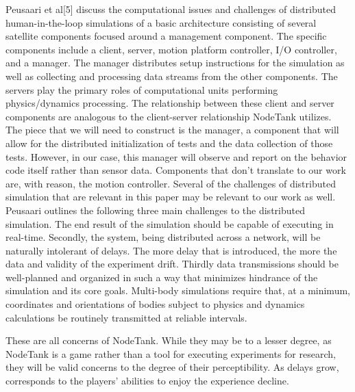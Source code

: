 \documentclass[conference]{IEEEtran}
\begin{document}
Peusaari et al[5] discuss the computational issues and challenges of distributed human-in-the-loop simulations of a basic architecture consisting of several satellite components 
focused around a management component. The specific components include a client, server, motion platform controller, I/O controller, and a manager. The manager distributes setup 
instructions for the simulation as well as collecting and processing data  streams from the other components. The servers play the primary roles of computational units performing 
physics/dynamics processing. The relationship between these client and server components are analogous to the client-server relationship NodeTank utilizes. The piece that we will 
need to construct is the manager, a component that will allow for the distributed initialization of tests and the data collection of those tests. However, in our case, this manager
will observe and report on the behavior code itself rather than sensor data. Components that don’t translate to our work are, with reason, the motion controller. Several of the 
challenges of distributed simulation that are relevant in this paper may be relevant to our work as well. Peusaari outlines the following three main challenges to the distributed 
simulation. The end result of the simulation should be capable of executing in real-time. Secondly, the system, being distributed across a network, will be naturally intolerant of 
delays. The more delay that is introduced, the more the data and validity of the experiment drift. Thirdly data transmissions should be well-planned and organized in such a way that 
minimizes hindrance of the simulation and its core goals. Multi-body simulations require that, at a minimum, coordinates and orientations of bodies subject to physics and dynamics 
calculations be routinely transmitted at reliable intervals.

These are all concerns of NodeTank. While they may be to a lesser degree, as NodeTank is a game rather than a tool for executing experiments for research, they will be valid concerns
 to the degree of their perceptibility. As delays grow, corresponds to the players’ abilities to enjoy the experience decline.
\end{document}
